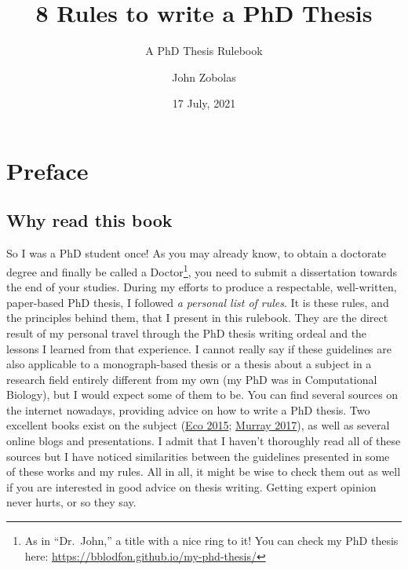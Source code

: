 \documentclass[
  12pt,
  oneside]{book}
\title{8 Rules to write a PhD Thesis}
\subtitle{A PhD Thesis Rulebook}
\author{John Zobolas}
\date{17 July, 2021}
\begin{document}
\maketitle

{
\hypersetup{linkcolor=}
\setcounter{tocdepth}{1}
\tableofcontents
}
\hypertarget{preface}{%
\chapter*{Preface}\label{preface}}

\hypertarget{why-read-this-book}{%
\section*{Why read this book}\label{why-read-this-book}}

So I was a PhD student once!
As you may already know, to obtain a doctorate degree and finally be called a Doctor\footnote{As in ``Dr.~John,'' a title with a nice ring to it! You can check my PhD thesis here: \url{https://bblodfon.github.io/my-phd-thesis/}}, you need to submit a dissertation towards the end of your studies.
During my efforts to produce a respectable, well-written, paper-based PhD thesis, I followed \emph{a personal list of rules}.
It is these rules, and the principles behind them, that I present in this rulebook.
They are the direct result of my personal travel through the PhD thesis writing ordeal and the lessons I learned from that experience.
I cannot really say if these guidelines are also applicable to a monograph-based thesis or a thesis about a subject in a research field entirely different from my own (my PhD was in Computational Biology), but I would expect some of them to be.
You can find several sources on the internet nowadays, providing advice on how to write a PhD thesis.
Two excellent books exist on the subject (\protect\hyperlink{ref-Eco2015}{Eco 2015}; \protect\hyperlink{ref-Murray2017}{Murray 2017}), as well as several online blogs and presentations.
I admit that I haven't thoroughly read all of these sources but I have noticed similarities between the guidelines presented in some of these works and my rules.
All in all, it might be wise to check them out as well if you are interested in good advice on thesis writing.
Getting expert opinion never hurts, or so they say.
\end{document}
